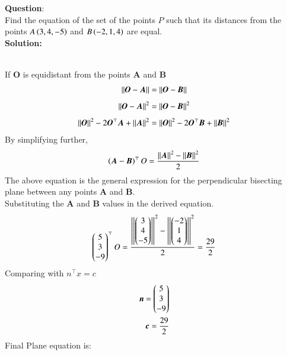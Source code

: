 \documentclass[journal]{IEEEtran}
\begin{document}
\textbf{Question}:\\
Find the equation of the set of the points $P$ such that its distances from the points
$A\left(3, 4, -5\right)$ and $B\left(-2, 1, 4\right)$ are equal.
\\ \textbf{Solution: }\\
    \begin{table}[h!]    
      \centering
      
      \caption{}
    \end{table}\\
If \textbf{O} is equidistant from the points \textbf{A} and \textbf{B}
    \begin{align}
        \left\vert\left\vert\boldsymbol{O}-\boldsymbol{A}\right\vert\right\vert = \left\vert\left\vert\boldsymbol{O}-\boldsymbol{B}\right\vert\right\vert\\ \label{eq1.1.8.28.1}
    \end{align}
     \begin{align}
        \left\vert\left\vert\boldsymbol{O}-\boldsymbol{A}\right\vert\right\vert^2 = \left\vert\left\vert\boldsymbol{O}-\boldsymbol{B}\right\vert\right\vert^2\label{eq1.1.8.28.2}\\
    \end{align}
    \begin{align}
    	\left\vert\left\vert\boldsymbol{O}\right\vert\right\vert^2 - 2\boldsymbol{O}^\top \boldsymbol{A} + \left\vert\left\vert\boldsymbol{A}\right\vert\right\vert^2 = \left\vert\left\vert\boldsymbol{O}\right\vert\right\vert^2 - 2\boldsymbol{O}^\top\boldsymbol{B} + \left\vert\left\vert\boldsymbol{B}\right\vert\right\vert^2\label{eq1.1.8.28.3}
    \end{align}
By simplifying further,
    \begin{align}
    	\left(\boldsymbol{A}-\boldsymbol{B}\right)^\top O = \frac{\left\vert\left\vert\boldsymbol{A}\right\vert\right\vert^2-\left\vert\left\vert\boldsymbol{B}\right\vert\right\vert^2}{2} \label{eq1.1.8.28.4}
    \end{align}
The above equation is the general expression for the perpendicular bisecting plane between any points $\boldsymbol{A}$ and $\boldsymbol{B}$.\\
Substituting the $\boldsymbol{A}$ and $\boldsymbol{B}$ values in the derived equation.\\
    \begin{align}
    	\begin{pmatrix}5 \\ 3 \\ -9\end{pmatrix}^\top O = \frac{\left\vert\left\vert\begin{pmatrix}3 \\ 4\\-5\end{pmatrix}\right\vert\right\vert^2-\left\vert\left\vert\begin{pmatrix}-2\\ 1\\4\end{pmatrix}\right\vert\right\vert^2}{2} = \frac{29}{2}\label{eq1.1.8.28.5}
    \end{align}
Comparing with $n^\top x = c$
    \begin{align}
    	\boldsymbol{n} = \begin{pmatrix}5 \\ 3 \\ -9\end{pmatrix}\\ \label{eq1.1.8.28.6}
	    \boldsymbol{c} = \frac{29}{2}\\    
    \end{align}
Final Plane equation is:
\end{document}
